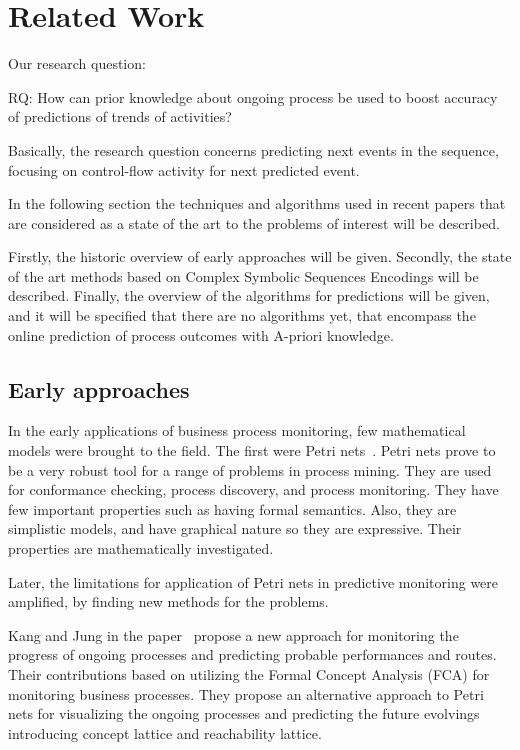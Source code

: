 \section{Related Work} %
\label{sec:related_work}


Our research question: 

RQ: How can prior knowledge about ongoing process be used to boost accuracy of predictions of trends of activities?

Basically, the research question concerns predicting next events in the sequence, focusing on control-flow activity for next predicted event.   

In the following section the techniques and algorithms used in recent papers that are considered as a state of the art to the problems of interest will be described.

Firstly, the historic overview of early approaches will be given.
Secondly, the state of the art methods based on Complex Symbolic Sequences Encodings will be described. 
Finally, the overview of the algorithms for predictions will be given, and it will be specified that there are no algorithms yet, that encompass the online prediction of process outcomes with A-priori knowledge.



\subsection{Early approaches}

In the early applications of business process monitoring, few mathematical models were brought to the field. The first were Petri nets~\cite{doi:10.1142/S0218126698000043}. Petri nets prove to be a very robust tool for a range of problems in process mining. They are used for conformance checking, process discovery, and process monitoring. They have few important properties such as having formal semantics. Also, they are simplistic models, and have graphical nature so they are expressive. Their properties are mathematically investigated. 

Later, the limitations for application of Petri nets in predictive monitoring were amplified, by finding new methods for the problems.

Kang and Jung in the paper~\cite{doi:10.1108/02635571111137241} propose a new approach for monitoring the progress of ongoing processes and predicting probable performances and routes. Their contributions based on utilizing the Formal Concept Analysis (FCA) for monitoring business processes. They propose an alternative approach to Petri nets for visualizing the ongoing processes and predicting the future evolvings introducing concept lattice and reachability lattice.   

